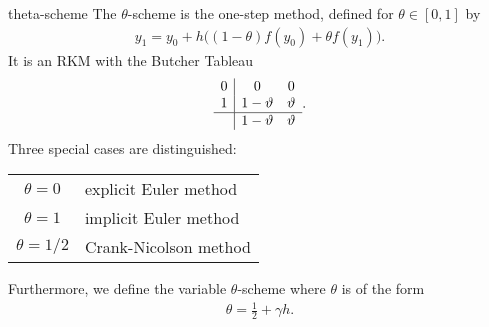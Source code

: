 \begin{Definition}{theta-scheme}
  The $\theta$-scheme is the one-step method, defined for $\theta\in
  [0,1]$ by
  \begin{gather}
    \label{eq:theta:1}
    y_1 = y_0 + h \bigl((1-\theta) f(y_0) + \theta f(y_1)\bigr).
  \end{gather}
  It is an RKM with the Butcher Tableau
  \begin{gather}
    \label{eq:theta:2}
    \begin{array}{c|cc}
      0 & 0 & 0 \\
      1 & 1-\theta & \theta \\\hline
      & 1-\theta & \theta
    \end{array}.
  \end{gather}
  Three special cases are distinguished:
  \begin{center}
  \begin{tabular}{c|l}
    $\theta=0$ & explicit Euler method\\
    $\theta=1$ & implicit Euler method\\
    $\theta=1/2$ & Crank-Nicolson method
  \end{tabular}    
  \end{center}

  Furthermore, we define the variable $\theta$-scheme where $\theta$ is
  of the form
  \begin{gather*}
    \theta = \frac12 + \gamma h.
  \end{gather*}
\end{Definition}
